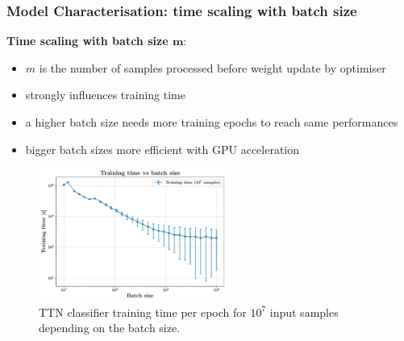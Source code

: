 \documentclass[xcolor=table,8pt]{beamer}
\begin{document}
    \begin{frame}[t]
        \frametitle{Model Characterisation: time scaling with batch size}

        \textbf{Time scaling with batch size \( \boldsymbol{m} \)}:
        \begin{itemize}
            \item \( m \) is the number of samples processed before weight update by optimiser
            \item strongly influences training time
            \item a higher batch size needs more training epochs to reach same performances
            \item \alert{bigger batch sizes more efficient with GPU acceleration}
        \end{itemize}

        \vspace{5pt}
        \begin{figure}[!h]
            \centering
            \includegraphics[width=0.55\textwidth]{images/results/results_characterisation_batch.pdf}
            \caption{TTN classifier training time per epoch for \( 10^{7} \) input samples depending on the batch size.}
            \label{fig:results_characterisation_batch}
        \end{figure}
    \end{frame}
\end{document}
